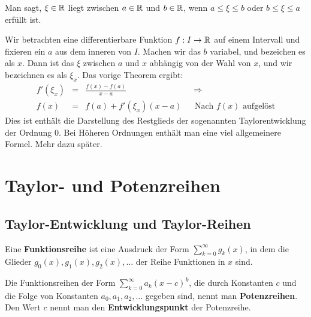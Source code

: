 \begin{defn}
	Man sagt, $\xi \in \mathbb{R}$ liegt zwischen $a \in \mathbb{R}$ und $b \in \mathbb{R}$, wenn $a \le \xi \le b$ oder $b \le \xi \le a$ erfüllt ist. 
\end{defn} 


\begin{bem} 
	Wir betrachten eine differentierbare Funktion $f : I \to \mathbb{R}$ auf einem Intervall und fixieren ein $a$ aus dem inneren von $I$. 
	Machen wir das $b$ variabel, und bezeichen es als $x$. Dann ist das $\xi$ zwischen $a$ und $x$ abhängig von der Wahl von $x$, und wir bezeichnen es als $\xi_x$. Das vorige Theorem ergibt: 
	\[
	\begin{array}{rcl|l}
		f'(\xi_x)  & =& \frac{f(x)-f(a)}{x-a} \hspace{7em} & \ \Rightarrow 
		\\ f(x) & = & f(a) + f'(\xi_x) (x-a) &  \text{ Nach $f(x)$ aufgelöst} 
	\end{array}
	\]
	Dies ist enthält die Darstellung des Restglieds der sogenannten Taylorentwicklung der Ordnung $0$. 
	Bei Höheren Ordnungen enthält man eine viel allgemeinere Formel. Mehr dazu später. 
\end{bem} 

\chapter{Taylor- und Potenzreihen} 

\section{Taylor-Entwicklung und Taylor-Reihen} 

\begin{defn} 
	Eine \textbf{Funktionsreihe} ist eine Ausdruck der Form $\sum_{k=0}^\infty g_k(x)$, in dem die Glieder $g_0(x),g_1(x),g_2(x),\ldots$ der Reihe Funktionen in $x$ sind. 
	
	Die Funktionsreihen der Form $\sum_{k=0}^\infty a_k (x-c)^k$, die durch Konstanten $c$ und die Folge von Konstanten $a_0,a_1,a_2,\ldots$ gegeben sind,  nennt man \textbf{Potenzreihen}. Den Wert $c$ nennt man den \textbf{Entwicklungspunkt} der Potenzreihe. 
\end{defn} 


